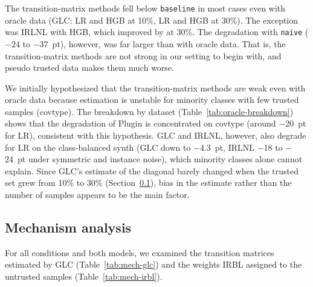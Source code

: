 \documentclass[a4paper,10pt]{article}
\newcommand{\method}[1]{\texttt{#1}}
\newcommand{\cl}{\textsf{cleanlab}}
\begin{document}
The transition-matrix methods fell below \method{baseline} in most cases even with oracle data (GLC: LR \OLRGLCTen{} and HGB \OHGBGLCTen{} at 10\%, LR \OLRGLCThirty{} and HGB \OHGBGLCThirty{} at 30\%).
The exception was IRLNL with HGB, which improved by \OHGBIRLNLThirty{} at 30\%.
The degradation with \method{naive} ($-$24 to $-$37~pt), however, was far larger than with oracle data.
That is, the transition-matrix methods are not strong in our setting to begin with, and pseudo trusted data makes them much worse.

We initially hypothesized that the transition-matrix methods are weak even with oracle data because estimation is unstable for minority classes with few trusted samples (covtype).
The breakdown by dataset (Table~\ref{tab:oracle-breakdown}) shows that the degradation of Plugin is concentrated on covtype (around $-$20~pt for LR), consistent with this hypothesis.
GLC and IRLNL, however, also degrade for LR on the class-balanced synth (GLC down to $-$4.3~pt, IRLNL $-$18 to $-$24~pt under symmetric and instance noise), which minority classes alone cannot explain.
Since GLC's estimate of the diagonal barely changed when the trusted set grew from 10\% to 30\% (Section~\ref{sec:mech}), bias in the estimate rather than the number of samples appears to be the main factor.

\begin{table}[tbp]
  \centering
  \caption{$\Delta$ (pt) by how the trusted set is built. naive and random are pseudo trusted sets from \cl{}; oracle10 and oracle30 are genuine trusted sets in which 10\% or 30\% of the samples, chosen uniformly at random, have their true labels restored. $^\dagger$ \method{bq/naive/trusted\_only} is identical to \method{cl\_prune}, so its value is shown.}
  \label{tab:oracle}
  \footnotesize
  
\end{table}

\begin{table}[tbp]
  \centering
  \caption{$\Delta$ (pt) with genuine trusted data, broken down by dataset and noise (mean over 2 noise rates $\times$ 5 seeds). sym = symmetric, inst = instance.}
  \label{tab:oracle-breakdown}
  \scriptsize
  \setlength{\tabcolsep}{3.5pt}
  
\end{table}

\subsection{Mechanism analysis}\label{sec:mech}
For all \NCond{} conditions and both models, we examined the transition matrices estimated by GLC (Table~\ref{tab:mech-glc}) and the weights IRBL assigned to the untrusted samples (Table~\ref{tab:mech-irbl}).
\end{document}

